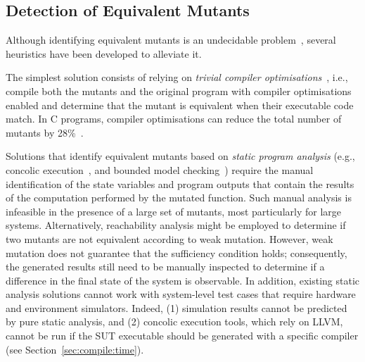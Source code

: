 \subsection{Detection of Equivalent Mutants}

Although identifying equivalent mutants is an undecidable problem~\cite{madeyski2013overcoming,Bugg:Correctness:82}, several heuristics have been developed to alleviate it. 

The simplest solution consists of relying on \emph{trivial compiler optimisations}~\cite{papadakis2015trivial, kintis2017detecting,papadakis2019mutation}, i.e., compile both the mutants and the original program with compiler optimisations enabled and determine that the mutant is equivalent when their executable code match. In C programs, compiler optimisations can reduce the total number of mutants by 28\%~\cite{kintis2017detecting}.



Solutions that identify equivalent mutants based on \emph{static program analysis} (e.g., concolic execution~\cite{holling2016nequivack}, and bounded model checking~\cite{riener2011test}) require the manual identification of the state variables and program outputs that contain the results of the computation performed by the mutated function.
Such manual analysis is infeasible in the presence of a large set of mutants, most particularly for large systems. 
Alternatively, reachability analysis might be employed to determine if two mutants are not equivalent according to weak mutation. 
However, weak mutation does not guarantee that the sufficiency condition holds; consequently, the generated results still need to be manually inspected to determine if a difference in the final state of the system is observable. In addition, existing static analysis solutions cannot work with system-level test cases that require hardware and environment simulators.
Indeed, (1) simulation results cannot be predicted by pure static analysis, and (2) concolic execution tools, which rely on LLVM, cannot be run if the SUT executable should be generated with a specific compiler (see Section~\ref{sec:compile:time}).

